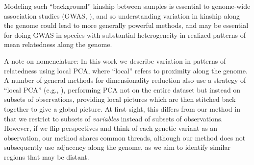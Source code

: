 \documentclass[11pt, oneside]{article}   	%
\begin{document}
Modeling such ``background'' kinship between samples
is essential to genome-wide association studies (GWAS, \citep{price2006principal,astle2009population}),
and so understanding variation in kinship along the genome 
could lead to more generally powerful methods,
and may be essential for doing GWAS in species with substantial heterogeneity in realized patterns of mean relatedness along the genome.



A note on nomenclature: In this work we describe variation in patterns of relatedness using local PCA,
where ``local'' refers to proximity along the genome.
A number of general methods for dimensionality reduction also use a strategy of ``local PCA''
(e.g., \citep{manjon2013diffusion,kambhatla1997dimension,weingessel2000local,roweis2000nonlinear}),
performing PCA not on the entire dataset but instead on subsets of observations,
providing local pictures which are then stitched back together to give a global picture.
At first sight,
this differs from our method in that we restrict to subsets of \emph{variables} instead of subsets of observations.
However, if we flip perspectives and think of each genetic variant as an observation,
our method shares common threads, although 
our method does not subsequently use adjacency along the genome,
as we aim to identify similar regions that may be distant.
\end{document}
